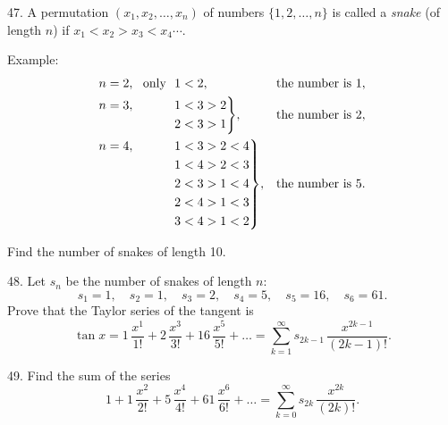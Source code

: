 \begin{problem}{47.}
	A permutation $(x_1,x_2, \dotsc,x_n)$ of numbers $\{1, 2, \dotsc, n\}$ is called a 
    \emph{snake} (of length $n$) if $x_1<x_2>x_3<x_4 \dotsb$.

	\begin{note}{Example:}
		\begin{equation*}
			\begin{aligned}[t]
				&\begin{aligned}[t] n=2, \text{\ \ only\ \ } 1<2, \end{aligned} &&\text{the number is }1, \\
				&\hskip-\nulldelimiterspace\mathord{\left.\begin{aligned} n=3, \hphantom{\text{\ \ only\ \ }} 1&<3>2 \\ 
				2&<3>1\end{aligned} \right\}}, && \text{the number is }2, \\
				&\hskip-\nulldelimiterspace\mathord{\left.\begin{aligned} n=4, \hphantom{\text{\ \ only\ \ }} 1&<3>2<4 \\ 
				1&<4>2<3 \\ 
				2&<3>1<4 \\ 
				2&<4>1<3 \\ 
				3&<4>1<2\end{aligned} \right\}},
				&&\text{the number is }5. \\
			\end{aligned}
		\end{equation*}
	\end{note}
	Find the number of snakes of length 10.
\end{problem}

\begin{problem}{48.}
	Let $s_n$ be the number of snakes of length $n$:
	\begin{equation*}
		s_1=1, \quad s_2=1, \quad s_3=2, \quad s_4=5, \quad s_5=16, \quad s_6=61.
	\end{equation*}
	Prove that the Taylor series of the tangent is
	\begin{equation*}
		\tan x=1\, \frac{x^1}{1!}+2\, \frac{x^3}{3!}+16\, \frac{x^5}{5!}+\dots=
		\textstyle\sum\limits_{k=1}^{\infty} s_{2k-1}\, \frac{x^{2k-1}}{(2k-1)!}.
	\end{equation*}
\end{problem}

\begin{problem}{49.}
	Find the sum of the series
	\begin{equation*}
		1+1\, \frac{x^2}{2!}+5\, \frac{x^4}{4!}+61\, \frac{x^6}{6!}+\dots=
		\textstyle\sum\limits_{k=0}^{\infty} s_{2k}\,\frac{x^{2k}}{(2k)!}.
	\end{equation*}
\end{problem}

